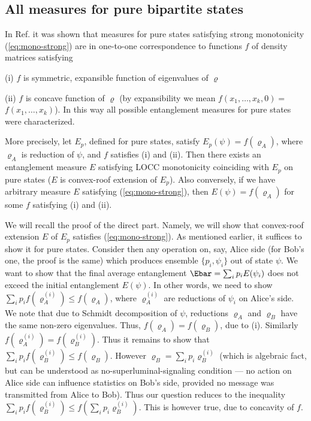 \documentclass[rmp,12pt,preprint]{revtex4-2}
\begin{document}
\subsection{All measures for pure bipartite states}
\label{subsec:all-pure}

In Ref. \cite{Vidal-mon2000} it was shown that measures for pure states
satisfying strong monotonicity (\ref{eq:mono-strong}) are in
one-to-one correspondence to functions $f$ of density matrices satisfying
\bei
\item[(i)] $f$ is symmetric, expansible function of eigenvalues of $\varrho$
\item[(ii)] $f$ is concave function of $\varrho$
\eei
(by expansibility we mean $f(x_1,\ldots,x_k,0)=$ $f(x_1,\ldots,x_k)$).
In this way all possible entanglement measures for pure  states were characterized.

More precisely, let $E_p$, defined for pure states,
satisfy $E_p(\psi)=f(\varrho_A)$, where $\varrho_A$ is reduction of $\psi$,
and $f$ satisfies (i) and (ii). Then there exists an entanglement  measure $E$
satisfying LOCC monotonicity coinciding with $E_p$ on pure states ($E$ is convex-roof
extension of $E_p$). Also conversely, if we have arbitrary measure
$E$ satisfying  (\ref{eq:mono-strong}), then  $E(\psi)=f(\varrho_A)$ for
some $f$ satisfying (i) and (ii).

We will recall the proof of the direct part. Namely, we will show
that convex-roof extension $E$ of $E_p$ satisfies
(\ref{eq:mono-strong}). As mentioned earlier, it suffices to show it
for pure states. Consider then any operation on, say, Alice side
(for Bob's one, the proof is the same) which produces ensemble
$\{p_i,\psi_i\}$ out of state $\psi$. We want to show that the final
average entanglement $\Ebar=\sum_ip_iE(\psi_i)$ does not exceed the
initial entanglement $E(\psi)$. In other words, we need to show
$\sum_ip_i f(\varrho_A^{(i)})\leq f(\varrho_A)$, where
$\varrho_A^{(i)}$ are reductions of $\psi_i$ on Alice's side.  We
note that due to Schmidt decomposition of $\psi$, reductions
$\varrho_A$ and $\varrho_B$ have the same non-zero eigenvalues.
Thus, $f(\varrho_A) =f(\varrho_B)$, due to (i). Similarly
$f(\varrho_A^{(i)})= f(\varrho_B^{(i)})$. Thus it remains to show
that $\sum_ip_i f(\varrho_B^{(i)})\leq f(\varrho_B)$. However
$\varrho_B= \sum_ip_i\varrho_B^{(i)}$ (which is algebraic fact, but
can be understood as no-superluminal-signaling condition --- no action
on Alice side can influence statistics on Bob's side, provided  no
message was transmitted from Alice to Bob). Thus our question
reduces to the inequality $\sum_ip_i f(\varrho_B^{(i)})\leq
f(\sum_ip_i\varrho_B^{(i)})$. This is however true, due to concavity
of $f$.
\end{document}
